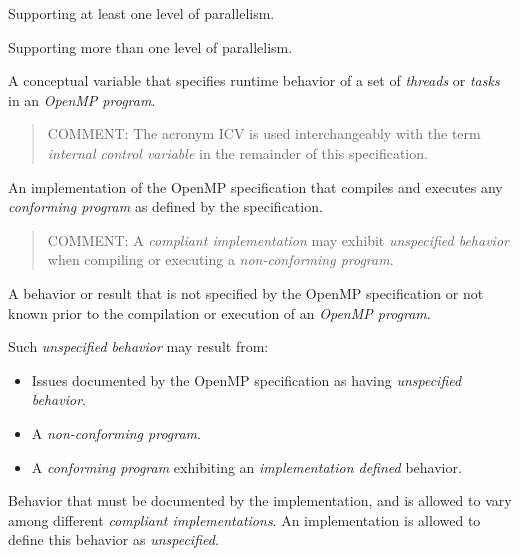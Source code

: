 \glossarydefstart
Supporting at least one level of parallelism.
\glossarydefend
\bigskip

\glossarydefstart
Supporting more than one level of parallelism.  
\glossarydefend
\bigskip

\glossarydefstart
A conceptual variable that specifies runtime behavior of a set of \emph{threads} or \emph{tasks} 
in an \emph{OpenMP program}.

\begin{quote}
COMMENT: The acronym ICV is used interchangeably with the term \emph{internal 
control variable} in the remainder of this specification.
\end{quote}
\glossarydefend

\glossarydefstart
An implementation of the OpenMP specification that compiles and executes any 
\emph{conforming program} as defined by the specification.

\begin{quote}
COMMENT: A \emph{compliant implementation} may exhibit \emph{unspecified behavior} when 
compiling or executing a \emph{non-conforming program}.
\end{quote}
\glossarydefend

\glossarydefstart
A behavior or result that is not specified by the OpenMP specification or not 
known prior to the compilation or execution of an \emph{OpenMP program}.

Such \emph{unspecified behavior} may result from:

\begin{itemize}
\item Issues documented by the OpenMP specification as having \emph{unspecified 
behavior}.

\item A \emph{non-conforming program}.

\item A \emph{conforming program} exhibiting an \emph{implementation defined} behavior.
\end{itemize}
\glossarydefend

\glossarydefstart
Behavior that must be documented by the implementation, and is allowed to vary 
among different \emph{compliant implementations}. An implementation is allowed to 
define this behavior as \emph{unspecified}.

